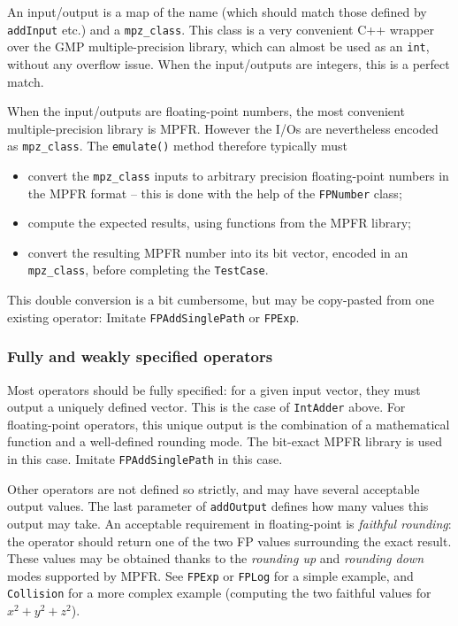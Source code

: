 \documentclass{article}
\begin{document}
An input/output is a map of the name (which should match those defined by \texttt{\small addInput} etc.) and a \texttt{\small mpz\_class}. This class is a very convenient C++ wrapper over the GMP multiple-precision library, which can almost be used as an \texttt{\small int}, without any overflow issue. When the input/outputs are integers, this is a perfect match.

When the input/outputs are floating-point numbers, the most convenient multiple-precision library is MPFR. However the I/Os  are nevertheless encoded as \texttt{\small mpz\_class}. The \texttt{\small emulate()} method therefore typically must
\begin{itemize}
\item convert the \texttt{\small mpz\_class} inputs to arbitrary precision floating-point numbers in the MPFR format -- this is done with the help of the \texttt{\small FPNumber} class;
\item compute the expected results, using functions from the MPFR library;
\item convert the resulting MPFR number into its bit vector, encoded in an \texttt{\small mpz\_class}, before completing the \texttt{\small TestCase}. 
\end{itemize}
This double conversion is a bit cumbersome, but may be copy-pasted from one existing operator: Imitate \texttt{\small FPAddSinglePath} or \texttt{\small FPExp}.


\subsubsection{Fully and weakly specified operators}
 Most operators should be fully specified: for a given input
  vector, they must output a uniquely defined vector. This is the case of 
  \texttt{\small IntAdder} above. For floating-point
  operators, this unique output is the combination of a mathematical
  function and a well-defined rounding mode. The bit-exact MPFR
  library is used in this case. Imitate \texttt{\small FPAddSinglePath} in this case.

 Other operators are not defined so strictly, and may have
  several acceptable output values. The last parameter of \texttt{\small addOutput}
  defines how many values this output may take. An acceptable
  requirement in floating-point is \emph{faithful rounding}: the
  operator should return one of the two FP values surrounding the
  exact result. These values may be obtained thanks to the
  \emph{rounding up} and \emph{rounding down} modes supported by
  MPFR. See \texttt{\small FPExp} or \texttt{\small FPLog} for a simple example, and
  \texttt{\small Collision} for a more complex example (computing the two
  faithful values for $x^2+y^2+z^2$).
\end{document}
